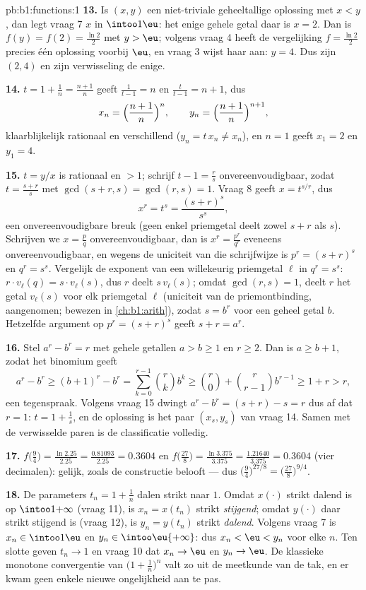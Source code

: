 \begin{solution}{pb:b1:functions:1}
\textbf{13.} Is $(x, y)$ een niet-triviale geheeltallige oplossing met
$x < y$, dan legt vraag 7 $x$ in $\intoo1\eu$: het enige gehele getal
daar is $x = 2$. Dan is $f(y) = f(2) = \frac{\ln2}2$ met $y > \eu$;
volgens vraag 4 heeft de vergelijking $f = \frac{\ln2}2$ precies één
oplossing voorbij $\eu$, en vraag 3 wijst haar aan: $y = 4$. Dus zijn
$(2, 4)$ en zijn verwisseling de enige.

\textbf{14.} $t = 1 + \frac1n = \frac{n+1}n$ geeft $\frac1{t - 1} = n$
en $\frac t{t-1} = n + 1$, dus
\[
x_n = \Bigl(\frac{n+1}n\Bigr)^{n},
\qquad
y_n = \Bigl(\frac{n+1}n\Bigr)^{n+1},
\]
klaarblijkelijk rationaal en verschillend ($y_n = t\,x_n \neq x_n$), en
$n = 1$ geeft $x_1 = 2$ en $y_1 = 4$.

\textbf{15.} $t = y/x$ is rationaal en $> 1$; schrijf $t - 1 = \frac rs$
onvereenvoudigbaar, zodat $t = \frac{s + r}s$ met $\gcd(s + r, s) =
\gcd(r, s) = 1$. Vraag 8 geeft $x = t^{s/r}$, dus
\[
x^r = t^s = \frac{(s+r)^s}{s^s} ,
\]
een onvereenvoudigbare breuk (geen enkel priemgetal deelt zowel $s + r$
als $s$). Schrijven we $x = \frac pq$ onvereenvoudigbaar, dan is $x^r =
\frac{p^r}{q^r}$ eveneens onvereenvoudigbaar, en wegens de uniciteit van
die schrijfwijze is $p^r = (s+r)^s$ en $q^r = s^s$. Vergelijk de exponent
van een willekeurig priemgetal $\ell$ in $q^r = s^s$: $r \cdot v_\ell(q)
= s \cdot v_\ell(s)$, dus $r$ deelt $s\,v_\ell(s)$; omdat $\gcd(r, s) =
1$, deelt $r$ het getal $v_\ell(s)$ voor elk priemgetal $\ell$
(uniciteit van de priemontbinding, aangenomen; bewezen in
\cref{ch:b1:arith}), zodat $s = b^r$ voor een geheel getal $b$.
Hetzelfde argument op $p^r = (s+r)^s$ geeft $s + r = a^r$.

\textbf{16.} Stel $a^r - b^r = r$ met gehele getallen $a > b \geq 1$ en
$r \geq 2$. Dan is $a \geq b + 1$, zodat het binomium geeft
\[
a^r - b^r \geq (b+1)^r - b^r
= \sum_{k=0}^{r-1}\binom rk b^k
\geq \binom r0 + \binom r{r-1} b^{r-1}
\geq 1 + r > r ,
\]
een tegenspraak. Volgens vraag 15 dwingt $a^r - b^r = (s + r) - s = r$
dus af dat $r = 1$: $t = 1 + \frac1s$, en de oplossing is het paar
$(x_s, y_s)$ van vraag 14. Samen met de verwisselde paren is de
classificatie volledig.

\textbf{17.} $f\bigl(\tfrac94\bigr) = \frac{\ln 2.25}{2.25} =
\frac{0.81093}{2.25} = 0.3604$ en $f\bigl(\tfrac{27}8\bigr) = \frac{\ln
3.375}{3.375} = \frac{1.21640}{3.375} = 0.3604$ (vier decimalen):
gelijk, zoals de constructie belooft --- dus
$\bigl(\tfrac94\bigr)^{27/8} = \bigl(\tfrac{27}8\bigr)^{9/4}$.

\textbf{18.} De parameters $t_n = 1 + \frac1n$ dalen strikt naar $1$.
Omdat $x(\cdot)$ strikt dalend is op $\intoo1{+\infty}$ (vraag 11), is
$x_n = x(t_n)$ strikt \emph{stijgend}; omdat $y(\cdot)$ daar strikt
stijgend is (vraag 12), is $y_n = y(t_n)$ strikt \emph{dalend}. Volgens
vraag 7 is $x_n \in \intoo1\eu$ en $y_n \in \intoo\eu{+\infty}$: dus
$x_n < \eu < y_n$ voor elke $n$. Ten slotte geven $t_n \to 1$ en vraag
10 dat $x_n \to \eu$ en $y_n \to \eu$. De klassieke monotone convergentie
van $\bigl(1 + \frac1n\bigr)^n$ valt zo uit de meetkunde van de tak, en
er kwam geen enkele nieuwe ongelijkheid aan te pas.


\end{solution}
